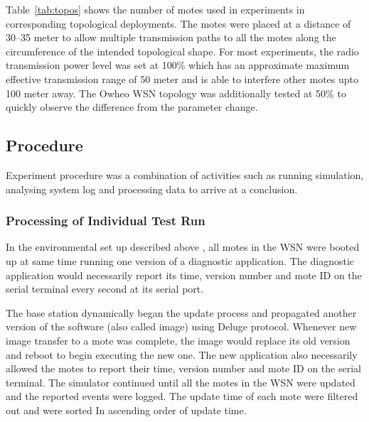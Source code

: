 \documentclass[conference,final]{IEEEtran}
\newcommand{\notedme}[1]{\raisebox{0pt}[0pt][0pt]{\pdfcomment[open=true,color=blue]{#1}}}
\begin{document}
Table~\ref{tab:topos} shows the number of motes used in experiments in corresponding topological  deployments.
The motes were placed at a distance of 30--35 meter to allow  multiple transmission paths to all the motes along the circumference of the intended topological shape. %
For most experiments, the radio transmission power level was set at 100\% which has an approximate maximum effective transmission range of 50 meter and is able to interfere other motes upto 100 meter away.
The Owheo WSN topology was additionally tested at 50\%  to quickly observe the difference from the parameter change.


\subsection*{Procedure}
\label{subsec:proc}

Experiment procedure  was a combination of activities such as running simulation, analysing system log and processing data to arrive at a conclusion. 


\subsubsection*{Processing  of Individual Test Run}
\label{ssc:test_runs}
In the environmental set up described above , all motes in the WSN were booted up at same time running one version of a diagnostic application. 
The diagnostic application would necessarily report its time, version number and mote ID on the serial terminal every second at its serial port. 


The base station dynamically began the update process and propagated another version of the software (also called image) using Deluge protocol. %
Whenever new image transfer to a mote was complete, the image would replace its old version and reboot to begin executing the new one.
The new application also necessarily allowed the motes to report their time, version number and mote ID on the serial terminal. 
The simulator continued until all the motes in the WSN were updated and the reported events were logged. 
The update time of each mote were filtered out  and were sorted In ascending order of update time.
\end{document}
